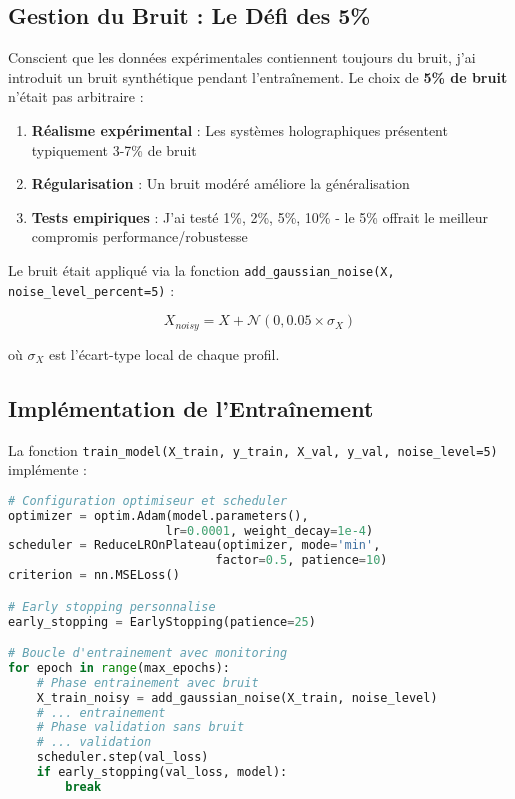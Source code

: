 \documentclass[11pt,a4paper,twocolumn]{article}
\begin{document}
\subsection{Gestion du Bruit : Le Défi des 5\%}

Conscient que les données expérimentales contiennent toujours du bruit, j'ai introduit un bruit synthétique pendant l'entraînement. Le choix de \textbf{5\% de bruit} n'était pas arbitraire :

\begin{enumerate}
    \item \textbf{Réalisme expérimental} : Les systèmes holographiques présentent typiquement 3-7\% de bruit
    \item \textbf{Régularisation} : Un bruit modéré améliore la généralisation
    \item \textbf{Tests empiriques} : J'ai testé 1\%, 2\%, 5\%, 10\% - le 5\% offrait le meilleur compromis performance/robustesse
\end{enumerate}

Le bruit était appliqué via la fonction \texttt{add\_gaussian\_noise(X, noise\_level\_percent=5)} :

$$X_{noisy} = X + \mathcal{N}(0, 0.05 \times \sigma_X)$$

où $\sigma_X$ est l'écart-type local de chaque profil.

\subsection{Implémentation de l'Entraînement}

La fonction \texttt{train\_model(X\_train, y\_train, X\_val, y\_val, noise\_level=5)} implémente :

\begin{lstlisting}[language=Python, basicstyle=\tiny]
# Configuration optimiseur et scheduler
optimizer = optim.Adam(model.parameters(),
                      lr=0.0001, weight_decay=1e-4)
scheduler = ReduceLROnPlateau(optimizer, mode='min',
                             factor=0.5, patience=10)
criterion = nn.MSELoss()

# Early stopping personnalise
early_stopping = EarlyStopping(patience=25)

# Boucle d'entrainement avec monitoring
for epoch in range(max_epochs):
    # Phase entrainement avec bruit
    X_train_noisy = add_gaussian_noise(X_train, noise_level)
    # ... entrainement
    # Phase validation sans bruit
    # ... validation
    scheduler.step(val_loss)
    if early_stopping(val_loss, model):
        break
\end{lstlisting}
\end{document}
